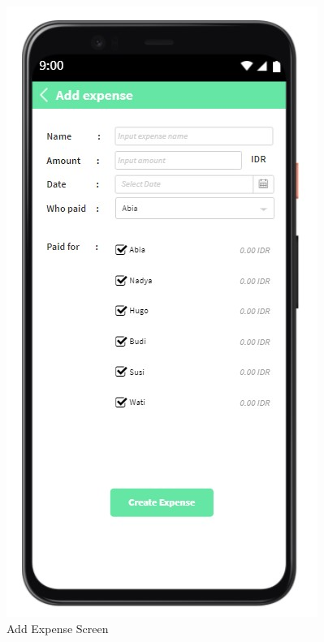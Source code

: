\documentclass[conference]{IEEEtran}
\begin{document}
\begin{enumerate}
\begin{figure}[H]
                \centerline{\includegraphics[scale=0.5]{img/ui/expenses-create.jpg}}
                \caption{Add Expense Screen}
                \label{fig:add-expense-screen}
            \end{figure}
            \begin{figure}[H]

\end{figure}
\end{enumerate}
\end{document}
